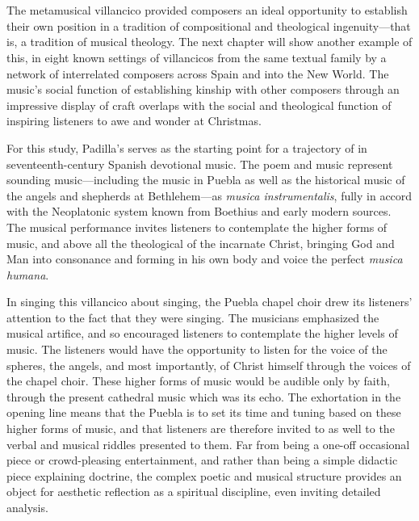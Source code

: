 \section{}

The metamusical villancico provided composers an ideal opportunity to establish
their own position in a tradition of compositional and theological
ingenuity---that is, a tradition of musical theology.
The next chapter will show another example of this, in eight known settings of
villancicos from the same textual family by a network of interrelated composers
across Spain and into the New World.
The music's social function of establishing kinship with other composers through
an impressive display of craft overlaps with the social and theological function
of inspiring listeners to awe and wonder at Christmas.

For this study, Padilla's  serves as the starting point for a trajectory
of  in seventeenth-century Spanish devotional music.
The poem and music represent sounding music---including the  music in
Puebla as well as the historical music of the angels and shepherds at
Bethlehem---as \emph{musica instrumentalis}, fully in accord with the Neoplatonic
system known from Boethius and early modern sources.
The musical performance invites listeners to contemplate the higher forms of
music, and above all the theological  of the incarnate Christ, bringing
God and Man into consonance and forming in his own body and voice the perfect
\emph{musica humana}.

In singing this villancico about singing, the Puebla chapel choir drew its
listeners' attention to the fact that they were singing.
The musicians emphasized the musical artifice, and so encouraged listeners to
contemplate the higher levels of music.
The listeners would have the opportunity to listen for the voice of the spheres,
the angels, and most importantly, of Christ himself through the voices of the
chapel choir.
These higher forms of music would be audible only by faith, through the present
cathedral music which was its echo.
The exhortation in the opening line means that the Puebla  is to
set its time and tuning based on these higher forms of music, and that listeners
are therefore invited to  as well to the verbal and musical
riddles presented to them.
Far from being a one-off occasional piece or crowd-pleasing entertainment, and
rather than being a simple didactic piece explaining doctrine, the complex
poetic and musical structure provides an object for aesthetic reflection as a
spiritual discipline, even inviting detailed analysis.

